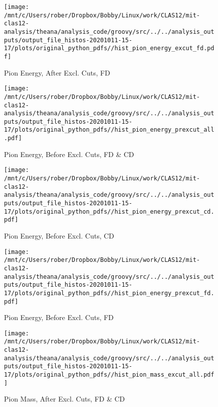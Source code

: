 \documentclass{article}
\begin{document}
\begin{landscape}
    \begin{figure}[h]
        \centering

        \texttt{[image: /mnt/c/Users/rober/Dropbox/Bobby/Linux/work/CLAS12/mit-clas12-analysis/theana/analysis\_code/groovy/src/../../analysis\_outputs/output\_file\_histos-20201011-15-17/plots/original\_python\_pdfs//hist\_pion\_energy\_excut\_fd.pdf]}
        \captionsetup{textformat=empty,labelformat=blank}
        \caption{Pion Energy, After Excl. Cuts, FD}
    \end{figure}
    \clearpage
    
    \begin{figure}[h]
        \centering

        \texttt{[image: /mnt/c/Users/rober/Dropbox/Bobby/Linux/work/CLAS12/mit-clas12-analysis/theana/analysis\_code/groovy/src/../../analysis\_outputs/output\_file\_histos-20201011-15-17/plots/original\_python\_pdfs//hist\_pion\_energy\_prexcut\_all.pdf]}
        \captionsetup{textformat=empty,labelformat=blank}
        \caption{Pion Energy, Before Excl. Cuts, FD \& CD}
    \end{figure}
    \clearpage
    
    \begin{figure}[h]
        \centering

        \texttt{[image: /mnt/c/Users/rober/Dropbox/Bobby/Linux/work/CLAS12/mit-clas12-analysis/theana/analysis\_code/groovy/src/../../analysis\_outputs/output\_file\_histos-20201011-15-17/plots/original\_python\_pdfs//hist\_pion\_energy\_prexcut\_cd.pdf]}
        \captionsetup{textformat=empty,labelformat=blank}
        \caption{Pion Energy, Before Excl. Cuts, CD}
    \end{figure}
    \clearpage
    
    \begin{figure}[h]
        \centering

        \texttt{[image: /mnt/c/Users/rober/Dropbox/Bobby/Linux/work/CLAS12/mit-clas12-analysis/theana/analysis\_code/groovy/src/../../analysis\_outputs/output\_file\_histos-20201011-15-17/plots/original\_python\_pdfs//hist\_pion\_energy\_prexcut\_fd.pdf]}
        \captionsetup{textformat=empty,labelformat=blank}
        \caption{Pion Energy, Before Excl. Cuts, FD}
    \end{figure}
    \clearpage
    
    \begin{figure}[h]
        \centering

        \texttt{[image: /mnt/c/Users/rober/Dropbox/Bobby/Linux/work/CLAS12/mit-clas12-analysis/theana/analysis\_code/groovy/src/../../analysis\_outputs/output\_file\_histos-20201011-15-17/plots/original\_python\_pdfs//hist\_pion\_mass\_excut\_all.pdf]}
        \captionsetup{textformat=empty,labelformat=blank}
        \caption{Pion Mass, After Excl. Cuts, FD \& CD}
    \end{figure}
    \clearpage
    

\end{landscape}
\end{document}

